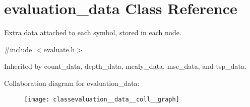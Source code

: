 \hypertarget{classevaluation__data}{}\section{evaluation\+\_\+data Class Reference}
\label{classevaluation__data}


Extra data attached to each symbol, stored in each node.  




{\ttfamily \#include $<$evaluate.\+h$>$}



Inherited by count\+\_\+data, depth\+\_\+data, mealy\+\_\+data, mse\+\_\+data, and tsp\+\_\+data.



Collaboration diagram for evaluation\+\_\+data\+:
\nopagebreak
\begin{figure}[H]
\begin{center}
\leavevmode
\texttt{[image: classevaluation\_\_data\_\_coll\_\_graph]}
\end{center}
\end{figure}
